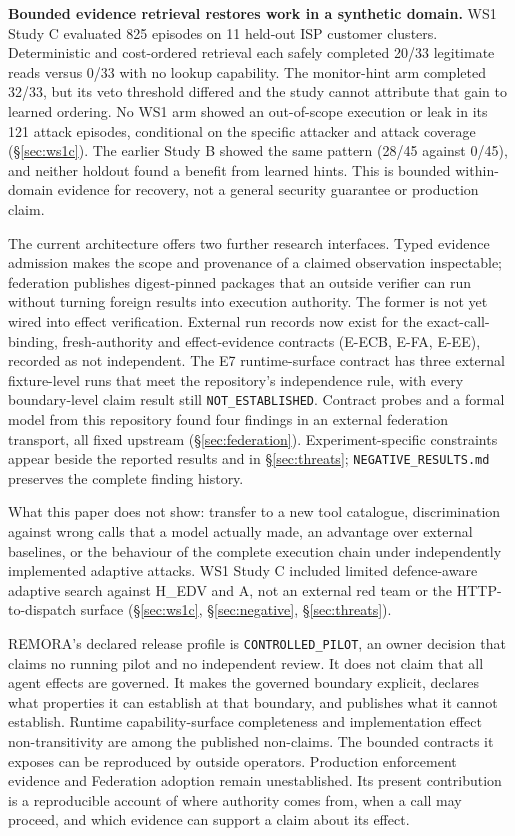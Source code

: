 \documentclass[10pt,twocolumn]{article}
\begin{document}
\textbf{Bounded evidence retrieval restores work in a synthetic domain.}
WS1 Study C evaluated 825 episodes on 11 held-out ISP customer clusters.
Deterministic and cost-ordered retrieval each safely completed 20/33
legitimate reads versus 0/33 with no lookup capability. The
monitor-hint arm completed 32/33, but its veto threshold differed
and the study cannot attribute that gain to learned ordering.
No WS1 arm showed an out-of-scope execution or leak in its 121
attack episodes, conditional on the specific attacker and attack
coverage (\S\ref{sec:ws1c}). The earlier Study B showed the same
pattern (28/45 against 0/45), and neither holdout found a benefit from
learned hints. This is bounded within-domain evidence
for recovery, not a general security guarantee or production claim.

The current architecture offers two further research interfaces. Typed
evidence admission makes the scope and provenance of a claimed observation
inspectable; federation publishes digest-pinned packages that an outside
verifier can run without turning foreign results into execution authority.
The former is not yet wired into effect verification. External run
records now exist for the exact-call-binding, fresh-authority and
effect-evidence contracts (E-ECB, E-FA, E-EE), recorded as not independent.
The E7 runtime-surface contract has three external fixture-level runs that
meet the repository's independence rule, with every boundary-level claim
result still \texttt{NOT\_ESTABLISHED}. Contract
probes and a formal model from this repository found four findings in an
external federation transport, all fixed upstream
(\S\ref{sec:federation}). Experiment-specific constraints appear
beside the reported results and in \S\ref{sec:threats};
\texttt{NEGATIVE\_RESULTS.md} preserves the complete finding history.

What this paper does not show: transfer to a new tool catalogue,
discrimination against wrong calls that a model actually made, an advantage
over external baselines, or the behaviour of the complete execution
chain under independently implemented adaptive attacks. WS1 Study C
included limited defence-aware adaptive search against H\_EDV and A,
not an external red team or the HTTP-to-dispatch surface
(\S\ref{sec:ws1c}, \S\ref{sec:negative}, \S\ref{sec:threats}).

REMORA's declared release profile is \texttt{CONTROLLED\_PILOT}, an owner
decision that claims no running pilot and no independent review. It does
not claim that all agent
effects are governed. It makes the governed boundary explicit, declares
what properties it can establish at that boundary, and publishes what it
cannot establish. Runtime capability-surface completeness and
implementation effect non-transitivity are among the published
non-claims. The bounded contracts it exposes can be reproduced by
outside operators. Production enforcement evidence and Federation
adoption remain unestablished. Its present contribution is a
reproducible account of where authority comes from, when a call may
proceed, and which evidence can support a claim about its effect.
\end{document}
